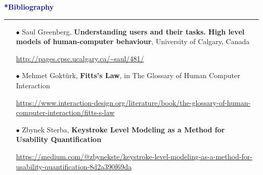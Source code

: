 \documentclass[pdf]{beamer}
\begin{document}
\begin{frame}
	\vspace{8mm}
	\textcolor{Blue}{\textbf{\Large{*Bibliography}}}
    \textcolor{red}{\rule{10cm}{1mm}}

        \begin{itemize}
        	\item[{$\bullet$}] Saul Greenberg, \textbf{Understanding users and their tasks. High level models of human-computer behaviour}, University of Calgary, Canada

        	\url{http://pages.cpsc.ucalgary.ca/~saul/481/}
        	\newline 
        	        	
        	\item[{$\bullet$}] Mehmet Goktürk, \textbf{Fitts's Law}, in The Glossary of Human Computer Interaction

        	\url{https://www.interaction-design.org/literature/book/the-glossary-of-human-computer-interaction/fitts-s-law}
        	\newline 
        	
        	\item[{$\bullet$}] Zbynek Sterba, \textbf{Keystroke Level Modeling as a Method for Usability Quantification}
        	
        	\url{https://medium.com/@zbynekste/keystroke-level-modeling-as-a-method-for-usability-quantification-8d2a390f69da}
     	\end{itemize}
\end{frame}
\end{document}
